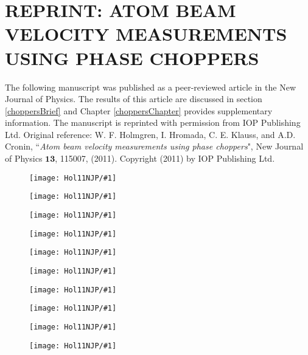 \chapter{REPRINT: ATOM BEAM VELOCITY MEASUREMENTS USING PHASE CHOPPERS}
\label{choppersAppendix}
The following manuscript was published as a peer-reviewed article in the New Journal of Physics. The results of this article are discussed in section \ref{choppersBrief} and Chapter \ref{choppersChapter} provides supplementary information. The manuscript is reprinted with permission from IOP Publishing Ltd. Original reference: W. F. Holmgren, I. Hromada, C. E. Klauss, and A.D. Cronin, ``\emph{Atom beam velocity measurements using phase choppers}", New Journal of Physics $\mathbf{13}$, 115007, (2011). Copyright (2011) by IOP Publishing Ltd.



\newcommand{\figNJP}[1]{
\begin{figure}
\texttt{[image: Hol11NJP/\#1]}
\end{figure}
} 


\figNJP{pg1}
\figNJP{pg2}
\figNJP{pg3}
\figNJP{pg4}
\figNJP{pg5}
\figNJP{pg6}
\figNJP{pg7}
\figNJP{pg8}
\figNJP{pg9}
\figNJP{pg10}